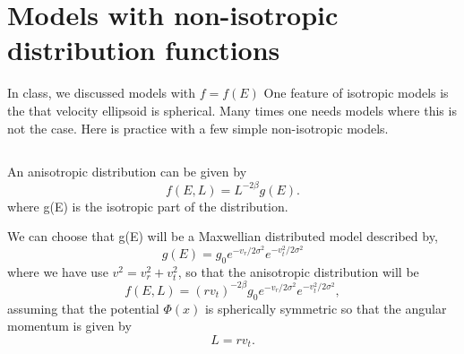 \section{Models with non-isotropic distribution functions}

In class, we discussed
models with $f=f(E)$ One feature of isotropic models is the that velocity ellipsoid is spherical. Many times one needs models where this
is not the case. Here is practice with a few simple non-isotropic models.

\subsection{}

An anisotropic distribution can be given by
\begin{equation}
    f(E,L)=L^{-2\beta}g(E).
\end{equation} 
where g(E) is the isotropic part of the distribution. 

We can choose that g(E) will be a Maxwellian distributed model described by,
\begin{equation}
    g(E)=g_0e^{-v_r/2\sigma^2}e^{-v_t^2/2\sigma^2}
    \label{eq:maxModel}
\end{equation}
where we have use $v^2=v_r^2+v_t^2$, so that the anisotropic distribution will be
\begin{equation}
    f(E,L)=(rv_t)^{-2\beta}g_0e^{-v_r/2\sigma^2}e^{-v_t^2/2\sigma^2},
\end{equation}
assuming that the potential $\Phi(x)$ is spherically symmetric so that the angular momentum is given by 
\begin{equation}
    L=rv_t.
    \label{eq:angMom}
\end{equation}

